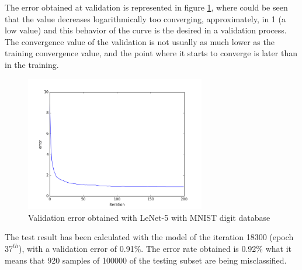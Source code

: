 The error obtained at validation is represented in figure \ref{fig:Lenetresult}, where could be seen that the value decreases logarithmically too converging, approximately, in 1 (a low value) and this behavior of the curve is the desired in a validation process. The convergence value of the validation is not usually as much lower as the training convergence value, and the point where it starts to converge is later than in the training.\\

\begin{figure}[htb]
\centering
\includegraphics[width=0.7\textwidth]{images/ModificandoLenet/error_lenet.png}
\caption{Validation error obtained with LeNet-5 with MNIST digit database} \label{fig:Lenetresult}
\end{figure}

The test result has been calculated with the model of the iteration 18300 (epoch $37^{th}$), with a validation error of 0.91\%. The error rate obtained is 0.92\% what it means that 920 samples of 100000 of the testing subset are being misclassified.\\




